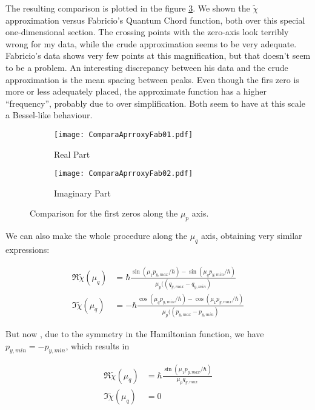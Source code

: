 \documentclass[a4paper,12pt]{article}
\begin{document}
The resulting comparison is plotted in the figure \ref{comparafab}. We shown the
$\tilde{ \chi }$ approximation versus Fabricio's Quantum Chord function, both
over this special one-dimensional section. The
crossing points with the zero-axis look terribly wrong for my data,
while the crude approximation seems to be very adequate. Fabricio's data
shows very few points at this magnification, but that doesn't seem to be a
problem. An interesting discrepancy between his data and the crude approximation
is the mean spacing between peaks. Even though the firs zero is more or
less adequately placed, the approximate function has a higher 
``frequency'', probably due to over simplification. Both seem to have at
this scale a Bessel-like behaviour.   


\begin{figure}[h]
  \centering
  \begin{subfigure}[b]{0.45\textwidth}
    \centering  
    \texttt{[image: ComparaAprroxyFab01.pdf]}
      \caption{Real Part}
      \label{comparafabreal}
  \end{subfigure}%
  \begin{subfigure}[b]{0.45\textwidth}
    \centering  
    \texttt{[image: ComparaAprroxyFab02.pdf]}
      \caption{Imaginary Part}
      \label{comparafabimag}
  \end{subfigure}%
  \caption{Comparison for the first zeros along the $\mu_p$ axis. 
}\label{comparafab}
\end{figure}     


We can also make the whole procedure along the $\mu_q$ axis, obtaining
very similar expressions:

\begin{align}
\Re \tilde{\chi} (\mu_q)  &= \hbar
\frac{\sin(\mu_1 p_{y,max} /\hbar)-\sin(\mu_q p_{y,min} /\hbar)}
{\mu_p ( (q_{y,max}- q_{y,min})} \\
\Im \tilde{\chi} (\mu_q)  &= -\hbar
\frac{\cos(\mu_q p_{y,min} /\hbar)-\cos(\mu_1 p_{y,max} /\hbar)}
{\mu_p ( (p_{y,max}- p_{y,min})} 
\end{align}

But now , due to the symmetry in the Hamiltonian function, we have
$p_{y,min}=-p_{y,min}$, which results in


\begin{align}\label{CrudeApprox2MuQ}
\Re \tilde{\chi} (\mu_q)  &= \hbar
\frac{\sin(\mu_1 p_{y,max} /\hbar)}
{\mu_p q_{y,max}} \\
\Im \tilde{\chi} (\mu_q)  &= 0
\end{align}
\end{document}
